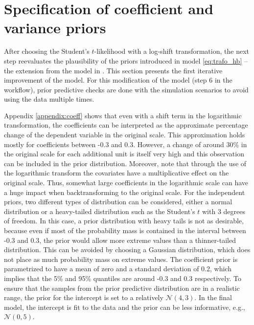 \section{Specification of coefficient and variance priors}
\label{ch:coef_var_spec}

After choosing the Student's $t$-likelihood with a log-shift transformation, the next step reevaluates the plausibility of the priors introduced in model \ref{eq:trafo_hb} – the extension from the model in \cite{morelli_hierarchical_2021}.
This section presents the first iterative improvement of the model.
For this modification of the model (step 6 in the workflow), prior predictive checks are done with the simulation scenarios to avoid using the data multiple times.

Appendix \ref{appendix:coeff} shows that even with a shift term in the logarithmic transformation, the coefficients can be interpreted as the approximate percentage change of the dependent variable in the original scale.
This approximation holds mostly for coefficients between -0.3 and 0.3.
However, a change of around 30\% in the original scale for each additional unit is itself very high and this observation can be included in the prior distribution.
Moreover, note that through the use of the logarithmic transform the covariates have a multiplicative effect on the original scale.
Thus, somewhat large coefficients in the logarithmic scale can have a huge impact when backtransforming to the original scale.
For the independent priors, two different types of distribution can be considered, either a normal distribution or a heavy-tailed distribution such as the Student's $t$ with 3 degrees of freedom.
In this case, a prior distribution with heavy tails is not as desirable, because even if most of the probability mass is contained in the interval between -0.3 and 0.3, the prior would allow more extreme values than a thinner-tailed distribution.
This can be avoided by choosing a Gaussian distribution, which does not place as much probability mass on extreme values.
The coefficient prior is parametrized to have a mean of zero and a standard deviation of 0.2, which implies that the 5\% and 95\% quantiles are around -0.3 and 0.3 respectively.
To ensure that the samples from the prior predictive distribution are in a realistic range, the prior for the intercept is set to a relatively $\mathcal N (4, 3)$.
In the final model, the intercept is fit to the data and the prior can be less informative, e.g., $\mathcal N(0, 5)$.

